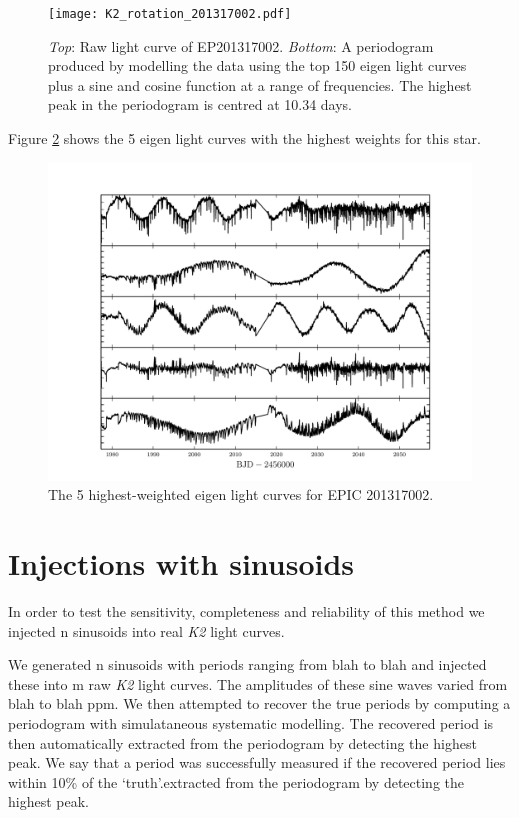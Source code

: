 \documentclass[useAMS, usenatbib]{aastex}
\begin{document}
\begin{figure}
\begin{center}
\texttt{[image: K2\_rotation\_201317002.pdf]}
\caption{{\it Top}: Raw light curve of EP201317002. {\it Bottom}: A
periodogram produced by modelling the data using the top 150 eigen light curves
plus a sine and cosine function at a range of frequencies. The highest peak in
the periodogram is centred at 10.34 days.}
\label{fig:K2_rotation_poster_child}
\end{center}
\end{figure}

Figure \ref{fig:top5} shows the 5 eigen light curves with the highest weights
for this star.

\begin{figure}
\begin{center}
\includegraphics[width=6in, clip=true]{201317002_top5.pdf}
\caption{The 5 highest-weighted eigen light curves for EPIC 201317002.}
\label{fig:top5}
\end{center}
\end{figure}

\section{Injections with sinusoids}

In order to test the sensitivity, completeness and reliability of this method
we injected n sinusoids into real {\it K2} light curves.

We generated n sinusoids with periods ranging from blah to blah and injected
these into m raw {\it K2} light curves.
The amplitudes of these sine waves varied from blah to blah ppm.
We then attempted to recover the true periods by computing a periodogram with
simulataneous systematic modelling.
The recovered period is then automatically extracted from the periodogram by
detecting the highest peak.
We say that a period was successfully measured if the recovered period lies
within 10\% of the `truth'.extracted from the periodogram by
detecting the highest peak.
\end{document}
